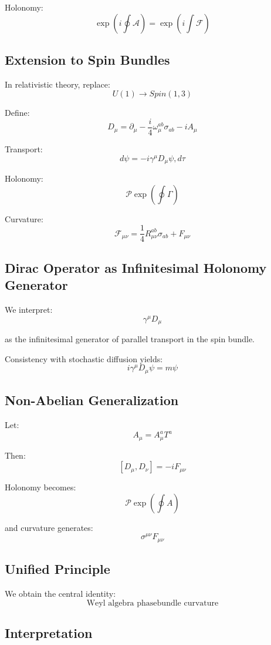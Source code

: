 \documentclass[11pt]{article}
\begin{document}
Holonomy:
\[
\exp\left(i \oint \mathcal{A}\right)
= \exp\left(i \int \mathcal{F}\right)
\]

\subsection{Extension to Spin Bundles}

In relativistic theory, replace:
\[
U(1) \rightarrow Spin(1,3)
\]

Define:
\[
D_\mu = \partial_\mu - \frac{i}{4}\omega_\mu^{ab}\sigma_{ab} - i A_\mu
\]

Transport:
\[
d\psi = -i \gamma^\mu D_\mu \psi, d\tau
\]

Holonomy:
\[
\mathcal{P} \exp\left( \oint \Gamma \right)
\]

Curvature:
\[
\mathcal{F}_{\mu\nu}
= \frac{1}{4}R_{\mu\nu}^{ab}\sigma_{ab} + F_{\mu\nu}
\]

\subsection{Dirac Operator as Infinitesimal Holonomy Generator}

We interpret:
\[
\gamma^\mu D_\mu
\]

as the infinitesimal generator of parallel transport in the spin bundle.

Consistency with stochastic diffusion yields:
\[
i \gamma^\mu D_\mu \psi = m \psi
\]

\subsection{Non-Abelian Generalization}

Let:
\[
A_\mu = A_\mu^a T^a
\]

Then:
\[
[D_\mu, D_\nu] = -i F_{\mu\nu}
\]

Holonomy becomes:
\[
\mathcal{P} \exp\left( \oint A \right)
\]

and curvature generates:
\[
\sigma^{\mu\nu} F_{\mu\nu}
\]

\subsection{Unified Principle}

We obtain the central identity:
\[
\boxed{
\text{Weyl algebra phase}
\text{bundle curvature}
}
\]

\subsection{Interpretation}
\end{document}
